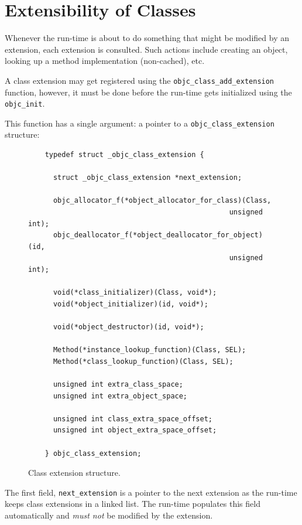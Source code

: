 \section{Extensibility of Classes}

Whenever the run-time is about to do something that might be modified by an extension, each extension is consulted. Such actions include creating an object, looking up a method implementation (non-cached), etc.

A class extension may get registered using the \verb=objc_class_add_extension= function, however, it must be done before the run-time gets initialized using the \verb=objc_init=.

This function has a single argument: a pointer to a \verb=objc_class_extension= structure:

\begin{figure}[H] 
  \begin{verbatim}
    typedef struct _objc_class_extension {

      struct _objc_class_extension *next_extension;
      
      objc_allocator_f(*object_allocator_for_class)(Class,
                                                unsigned int);
      objc_deallocator_f(*object_deallocator_for_object)(id,
                                                unsigned int);
      
      void(*class_initializer)(Class, void*);
      void(*object_initializer)(id, void*);
      
      void(*object_destructor)(id, void*);
        
      Method(*instance_lookup_function)(Class, SEL);
      Method(*class_lookup_function)(Class, SEL);
      
      unsigned int extra_class_space;
      unsigned int extra_object_space;
      
      unsigned int class_extra_space_offset;
      unsigned int object_extra_space_offset;
      
    } objc_class_extension;
  \end{verbatim}
  \centering{}
  \caption{Class extension structure.}
  \label{fig:class_ext_struct}
\end{figure}

The first field, \verb=next_extension= is a pointer to the next extension as the run-time keeps class extensions in a linked list. The run-time populates this field automatically and \emph{must not} be modified by the extension. 

